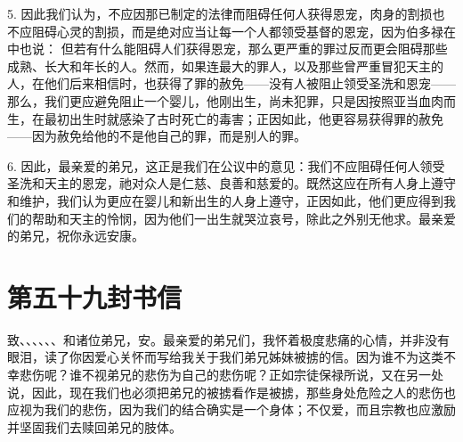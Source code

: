 5. 因此我们认为，不应因那已制定的法律而阻碍任何人获得恩宠，肉身的割损也不应阻碍心灵的割损，而是绝对应当让每一个人都领受基督的恩宠，因为伯多禄在中也说：  但若有什么能阻碍人们获得恩宠，那么更严重的罪过反而更会阻碍那些成熟、长大和年长的人。然而，如果连最大的罪人，以及那些曾严重冒犯天主的人，在他们后来相信时，也获得了罪的赦免——没有人被阻止领受圣洗和恩宠——那么，我们更应避免阻止一个婴儿，他刚出生，尚未犯罪，只是因按照亚当血肉而生，在最初出生时就感染了古时死亡的毒害；正因如此，他更容易获得罪的赦免——因为赦免给他的不是他自己的罪，而是别人的罪。\par

6. 因此，最亲爱的弟兄，这正是我们在公议中的意见：我们不应阻碍任何人领受圣洗和天主的恩宠，祂对众人是仁慈、良善和慈爱的。既然这应在所有人身上遵守和维护，我们认为更应在婴儿和新出生的人身上遵守，正因如此，他们更应得到我们的帮助和天主的怜悯，因为他们一出生就哭泣哀号，除此之外别无他求。最亲爱的弟兄，祝你永远安康。\par



\section{第五十九封书信}

\par

\par

致、、、、、、和诸位弟兄，安。最亲爱的弟兄们，我怀着极度悲痛的心情，并非没有眼泪，读了你因爱心关怀而写给我关于我们弟兄姊妹被掳的信。因为谁不为这类不幸悲伤呢？谁不视弟兄的悲伤为自己的悲伤呢？正如宗徒保禄所说，又在另一处说，因此，现在我们也必须把弟兄的被掳看作是被掳，那些身处危险之人的悲伤也应视为我们的悲伤，因为我们的结合确实是一个身体；不仅爱，而且宗教也应激励并坚固我们去赎回弟兄的肢体。\par

